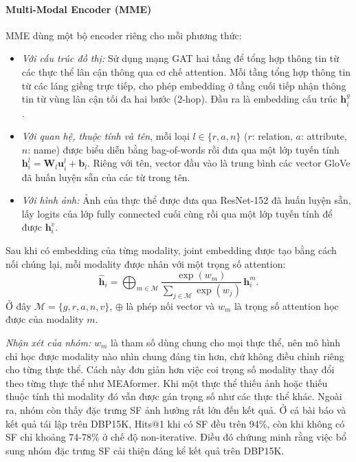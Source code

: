 \paragraph{Multi-Modal Encoder (MME)}

MME dùng một bộ encoder riêng cho mỗi phương thức: 
\begin{itemize}
    \item \textit{Với cấu trúc đồ thị:}
        Sử dụng mạng GAT hai tầng để tổng hợp
        thông tin từ các thực thể lân cận thông qua
        cơ chế attention. Mỗi tầng tổng hợp thông tin
        từ các láng giềng trực tiếp, cho phép embedding
        ở tầng cuối tiếp nhận thông tin từ vùng lân cận
        tối đa hai bước (2-hop). Đầu ra là embedding
        cấu trúc $\mathbf{h}^g_i$. %

    \item \textit{Với quan hệ, thuộc tính và tên}, mỗi loại $l \in \{r, a, n\}$ ($r$: relation, $a$: attribute, $n$: name) được biểu diễn bằng bag-of-words rồi đưa qua một lớp tuyến tính $\mathbf{h}^l_i = \mathbf{W}_l \mathbf{u}^l_i + \mathbf{b}_l$. Riêng với tên, vector đầu vào là trung bình các vector GloVe đã huấn luyện sẵn của các từ trong tên.

    \item \textit{Với hình ảnh:} Ảnh của thực thể được đưa qua ResNet-152 đã huấn luyện sẵn, lấy logits của lớp fully connected cuối cùng rồi qua một lớp tuyến tính để được $\mathbf{h}^v_i$.
\end{itemize}

Sau khi có embedding của từng modality, joint embedding được tạo bằng cách nối chúng lại, mỗi modality được nhân với một trọng số attention:
\[
    \hat{\mathbf{h}}_i
    = \bigoplus_{m \in \mathcal{M}}
    \frac{\exp(w_m)}{\sum_{j \in \mathcal{M}} \exp(w_j)}\,\mathbf{h}^m_i.
\]
Ở đây $\mathcal{M}=\{g,r,a,n,v\}$, $\oplus$ là phép nối vector và $w_m$ là trọng số attention học được của modality $m$.


\noindent\textit{Nhận xét của nhóm:} $w_m$ là tham số dùng chung cho mọi thực thể, nên mô hình chỉ học được modality nào nhìn chung đáng tin hơn, chứ không điều chỉnh riêng cho từng thực thể.
Cách này đơn giản hơn việc coi trọng số modality thay đổi theo từng thực thể như MEAformer\cite{chen2023meaformer}.
Khi một thực thể thiếu ảnh hoặc thiếu thuộc tính thì modality đó vẫn được gán trọng số như các thực thể khác.
Ngoài ra, nhóm còn thấy đặc trưng SF ảnh hưởng rất lớn đến kết quả.
Ở cả bài báo và kết quả tái lập trên DBP15K, Hits@1 khi có SF đều trên 94\%, còn khi không có SF chỉ khoảng 74-78\% ở chế độ non-iterative.
Điều đó chứung minh rằng việc bổ sung nhóm đặc trưng SF cải thiện đáng kể kết quả trên DBP15K. 

